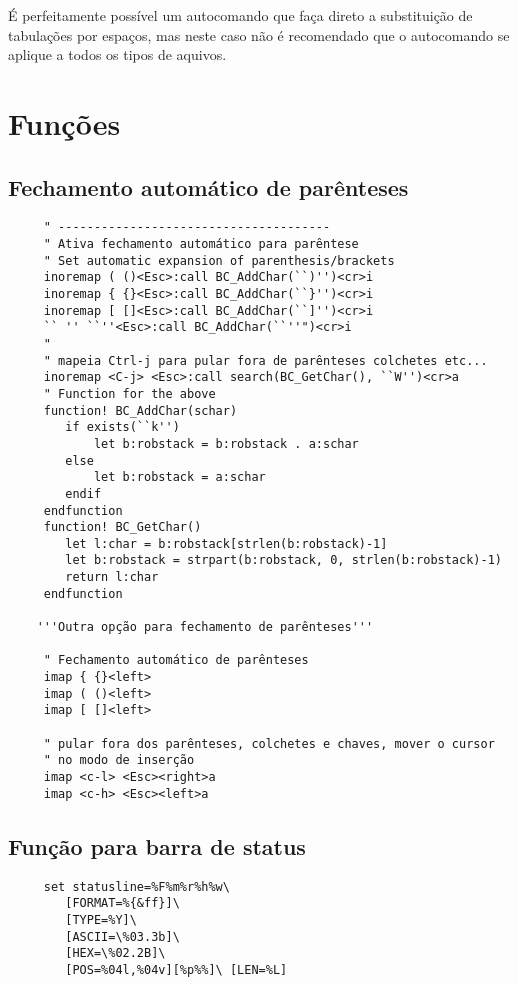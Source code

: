 É perfeitamente possível um autocomando que faça direto a substituição de
tabulações por espaços, mas neste caso não é recomendado que o autocomando se
aplique a todos os tipos de aquivos.

\section{Funções}
\label{sec:Funções}

\subsection{Fechamento automático de parênteses}
\label{sec:Fechamento automático de parênteses}

\begin{verbatim}
     " --------------------------------------
     " Ativa fechamento automático para parêntese
     " Set automatic expansion of parenthesis/brackets
     inoremap ( ()<Esc>:call BC_AddChar(``)'')<cr>i
     inoremap { {}<Esc>:call BC_AddChar(``}'')<cr>i
     inoremap [ []<Esc>:call BC_AddChar(``]'')<cr>i
     `` '' ``''<Esc>:call BC_AddChar(``''")<cr>i
     "
     " mapeia Ctrl-j para pular fora de parênteses colchetes etc...
     inoremap <C-j> <Esc>:call search(BC_GetChar(), ``W'')<cr>a
     " Function for the above
     function! BC_AddChar(schar)
        if exists(``k'')
            let b:robstack = b:robstack . a:schar
        else
            let b:robstack = a:schar
        endif
     endfunction
     function! BC_GetChar()
        let l:char = b:robstack[strlen(b:robstack)-1]
        let b:robstack = strpart(b:robstack, 0, strlen(b:robstack)-1)
        return l:char
     endfunction
    
    '''Outra opção para fechamento de parênteses'''
    
     " Fechamento automático de parênteses
     imap { {}<left>
     imap ( ()<left>
     imap [ []<left>
    
     " pular fora dos parênteses, colchetes e chaves, mover o cursor
     " no modo de inserção
     imap <c-l> <Esc><right>a
     imap <c-h> <Esc><left>a
\end{verbatim}

\subsection{Função para barra de status}\label{Função para barra de status}

\begin{verbatim}
     set statusline=%F%m%r%h%w\
        [FORMAT=%{&ff}]\
        [TYPE=%Y]\
        [ASCII=\%03.3b]\
        [HEX=\%02.2B]\
        [POS=%04l,%04v][%p%%]\ [LEN=%L]
\end{verbatim}

